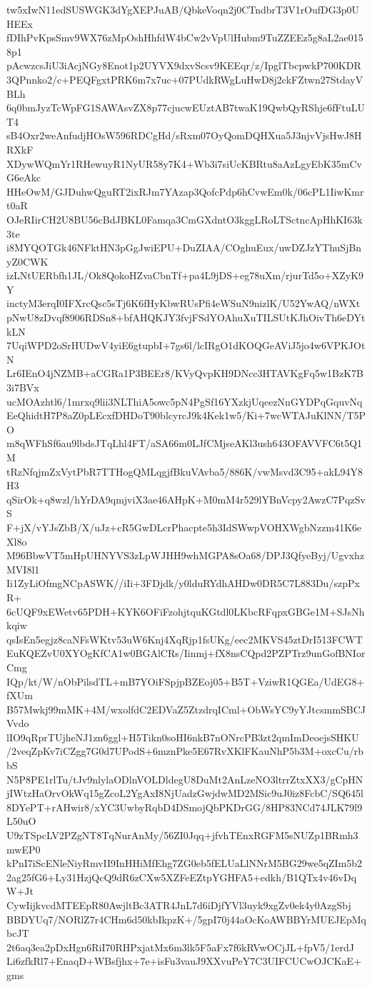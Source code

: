 tw5xIwN11edSUSWGK3dYgXEPJuAB/QbkeVoqn2j0CTndbrT3V1rOufDG3p0UHEEx
fDIhPvKpsSmv9WX76zMpOshHhfdW4bCw2vVpUlHubm9TuZZEEz5g8aL2ae0158p1
pAcwzcsJiU3iAcjNGy8Enot1p2UYVX9dxvScsv9KEEqr/z/IpglTbcpwkP700KDR
3QPnnko2/c+PEQFgxtPRK6m7x7uc+07PUdkRWgLuHwD8j2ckFZtwn27StdayVBLh
6q0bmJyzTcWpFG1SAWAsvZX8p77cjucwEUztAB7twaK19QwbQyRShje6fFtuLUT4
sB4Oxr2weAnfudjHOsW596RDCgHd/sRxm07OyQomDQHXua5J3njvVjsHwJ8HRXkF
XDywWQmYr1RHewuyR1NyUR58y7K4+Wb3i7siUcKBRtu8aAzLgyEbK35mCvG6eAkc
HHeOwM/GJDuhwQguRT2ixRJm7YAzap3QofcPdp6hCvwEm0k/06cPL1IiwKmrt0aR
OJeRIirCH2U8BU56cBdJBKL0Famqa3CmGXdntO3kggLRoLTSctncApHhKI63k3te
i8MYQOTGk46NFktHN3pGgJwiEPU+DuZIAA/COghuEux/uwDZJzYThuSjBnyZ0CWK
izLNtUERbfh1JL/Ok8QokoHZvaCbnTf+pa4L9jDS+eg78uXm/rjurTd5o+XZyK9Y
inctyM3erqI0IFXrcQsc5sTj6K6fHyKbwRUsPfi4eWSuN9nizlK/U52YwAQ/nWXt
pNwU8zDvqf8906RDSn8+bfAHQKJY3fvjFSdYOAhuXuTILSUtKJhOivTh6eDYtkLN
7UqiWPD2oSrHUDwV4yiE6gtupbI+7gs6l/lcIRgO1dKOQGeAViJ5jo4w6VPKJOtN
Lr6IEnO4jNZMB+aCGRa1P3BEEr8/KVyQvpKH9DNcc3HTAVKgFq5w1BzK7B3i7BVx
ucMOAzhtl6/1mrxq9lii3NLThiA5owc5pN4PgSf16YXzkjUqeezNnGYDPqGquvNq
EeQhidtH7P8aZ0pLEcxfDHDoT90blcyrcJ9k4Kek1w5/Ki+7wcWTAJuKlNN/T5PO
m8qWFhSf6au9lbdsJTqLhl4FT/aSA66m0LJfCMjseAKl3ush643OFAVVFC6t5Q1M
tRzNfqjmZxVytPbR7TTHogQMLqgjfBkuVAvba5/886K/vwMsvd3C95+akL94Y8H3
qSirOk+q8wzl/hYrDA9qmjviX3ae46AHpK+M0mM4r529lYBnVcpy2AwzC7PqzSvS
F+jX/vYJsZbB/X/uJz+cR5GwDLcrPhacpte5h3IdSWwpVOHXWgbNzzm41K6eXl8o
M96BbwVT5mHpUHNYVS3zLpWJHH9whMGPA8sOa68/DPJ3QfyeByj/UgvxhzMVI8l1
Ii1ZyLiOfmgNCpASWK//iIi+3FDjdk/y0lduRYdhAHDw0DR5C7L883Du/szpPxR+
6cUQF9xEWetv65PDH+KYK6OFiFzohjtquKGtdl0LKbcRFqpxGBGe1M+SJsNhkqiw
qsIsEn5egjz8caNFsWKtv53uW6Knj4XqRjp1fsUKg/eec2MKVS45ztDrI513FCWT
EuKQEZvU0XYOgKfCA1w0BGAlCRs/Iinmj+fX8nsCQpd2PZPTrz9unGofBNIorCmg
IQp/kt/W/nObPilsdTL+mB7YOiFSpjpBZEoj05+B5T+VziwR1QGEa/UdEG8+fXUm
B57Mwkj99mMK+4M/wxolfdC2EDVaZ5ZtzdrqICml+ObWsYC9yYJtcsmmSBCJVvdo
lIO9qRprTUjheNJ1zn6ggl+H5Tikn0soHI6nkB7nONrcPB3zt2qmImDeoejsSHKU
/2veqZpKv7iCZgg7G0d7UPodS+6mznPke5E67RvXKlFKauNhP5b3M+oxcCu/rbbS
N5P8PE1rlTu/tJv9nlylaODlnVOLDldegU8DuMt2AnLzeNO3ltrrZtxXX3/gCpHN
jIWtzHaOrvOkWq15gZcoL2YgAxI8NjUadzGwjdwMD2MSic9uJ0iz8FcbC/SQ645l
8DYePT+rAHwir8/xYC3UwbyRqbD4DSmojQbPKDrGG/8HP83NCd74JLK79l9L50uO
U9zTSpcLV2PZgNT8TqNurAnMy/56ZI0Jqq+jfvhTEnxRGFM5sNUZp1BRmh3mwEP0
kPnI7iScENleNiyRmvII9InHHiMfEhg7ZG0eb5fELUaLlNNrM5BG29we5qZIm5b2
2ag25fG6+Ly31HzjQcQ9dR6zCXw5XZFeEZtpYGHFA5+edkh/B1QTx4v46vDqW+Jt
CywIijkvcdMTEEpR80AwjltBc3ATR4JnL7d6iDjfYVl3uyk9xgZv0ek4y0AzgSbj
BBDYUq7/NORlZ7r4CHm6d50kbIkpzK+/5gpI70j44aOcKoAWBBYrMUEJEpMqbcJT
2t6aq3ea2pDxHgn6RiI70RHPxjatMx6m3lk5F5aFx7f6kRVwOCjJL+fpV5/1erdJ
Li6zfkRl7+EnaqD+WBsfjhx+7e+isFu3vauJ9XXvuPeY7C3UIFCUCwOJCKaE+gms
